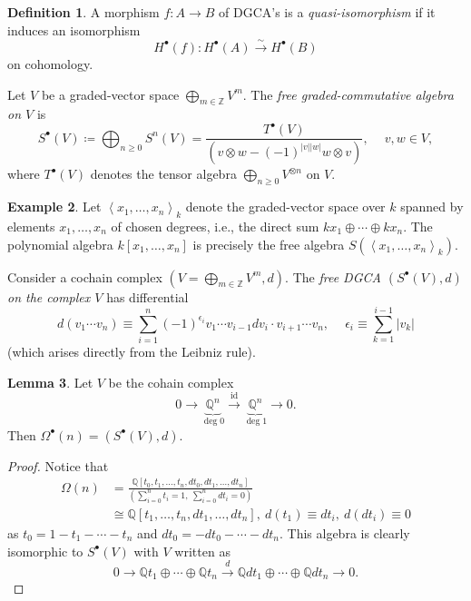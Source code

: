 \documentclass[10pt,letterpaper,cm]{nupset}
\theoremstyle{definition}
\newtheorem{defn}{Definition}[subsection]
\newtheorem{exmp}[defn]{Example}
\theoremstyle{theorem}
\newtheorem{lemma}[defn]{Lemma}
\theoremstyle{remark}
\newcommand{\Q}{\mathbb Q}
\newcommand{\Z}{\mathbb Z}
\newcommand{\1}{\mathbb{1}}
\newcommand{\0}{\vec 0}
\DeclareMathOperator{\id}{id}
\begin{document}
\begin{defn}
A morphism $f: A \to B$ of DGCA's is a \textit{quasi-isomorphism} if it induces an isomorphism
\[
H^{\bullet}(f) : H^{\bullet}(A) \xrightarrow{\sim} H^{\bullet}(B)
\] on cohomology.
\end{defn}

Let $V$ be a graded-vector space $\bigoplus_{m\in \Z} V^m$. The \textit{free graded-commutative algebra on $V$} is 
\[
S^{\bullet}(V) \coloneqq \bigoplus_{n\geq 0}S^n(V) = \frac{T^{\bullet}(V)}{\left(v \otimes w - \left({-1}\right)^{\left\lvert{v}\right\rvert \left\lvert{w}\right\rvert} w \otimes v \right)}, \ \quad v, w \in V,
\] where $T^{\bullet}(V)$ denotes the tensor algebra $\bigoplus_{n \geq 0}V^{\otimes n}$ on $V$.

\begin{exmp} 
 Let $\left\langle x_1, \ldots, x_n\right\rangle_k$ denote the graded-vector space over $k$ spanned by elements $x_1, \ldots, x_n$ of chosen degrees, i.e., the direct sum $kx_1 \oplus \cdots \oplus kx_n$. The polynomial algebra
$k\left[x_1, \ldots, x_n\right]$ is precisely the free algebra $S(\left\langle x_1, \ldots, x_n\right\rangle_k)$.
\end{exmp}

\smallskip

Consider a cochain complex $\left(V = \bigoplus_{m \in \Z}V^m, d\right)$. The \textit{free DGCA $\left(S^{\bullet}(V), d\right)$ on the complex $V$} has differential
\[
d(v_1\cdots v_n) \equiv \sum_{i=1}^n \left({-1}\right)^{\epsilon_i} v_1 \cdots v_{i-1}d{v_i}\cdot v_{i+1}\cdots v_n
, \ \quad \epsilon_i \equiv \sum_{k=1}^{i-1}\left\lvert{v_k}\right\rvert
\] (which arises directly from the Leibniz rule). 


\begin{lemma}
Let $V$ be the cohain complex
\[
0 \xrightarrow{} \underbrace{\Q^n}_{\deg 0} \xrightarrow{\id} \underbrace{\Q^n}_{\deg 1} \xrightarrow{} 0
.\] Then $\Omega^{\bullet}(n) = \left(S^{\bullet}(V), d\right)$.
\end{lemma}
\begin{proof}
Notice that
\begin{align*}
\Omega(n) & =  \frac{\Q\left[t_0, t_1, \ldots, t_n, d{t_0}, d{t_1},\ldots, d{t_n}\right]}{\left(\sum_{i=0}^n{t_i} = 1, \ \sum_{i=0}^n d{t_i} =0\right)}
\\ & \cong \Q\left[t_1, \ldots, t_n, d{t_1}, \ldots, d{t_n}\right], \ d(t_1) \equiv d{t_i}, \ d(d{t_i}) \equiv 0
\end{align*}
as $t_0 = 1 - t_1 - \cdots - t_n$ and $d{t_0} = {-d{t_0} - \cdots - d{t_n}}$. This algebra is clearly isomorphic to $S^{\bullet}(V)$ with $V$ written as
\[
0 \xrightarrow{} \Q t_1 \oplus \cdots \oplus \Q t_n \xrightarrow{d} \Q d{t_1} \oplus \cdots \oplus \Q dt_n \xrightarrow{} 0
.\] 
\end{proof}
\end{document}
